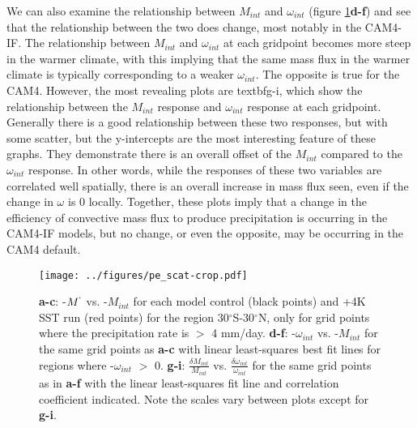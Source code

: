 \documentclass[letterpaper,12pt,titlepage,oneside,final]{book}
\begin{document}
We can also examine the relationship between $M_{int}$ and $\omega_{int}$ (figure \ref{fig:pe}\textbf{d-f}) and see that the relationship between the two does change, most notably in the CAM4-IF. The relationship between $M_{int}$ and $\omega_{int}$  at each gridpoint becomes more steep in the warmer climate, with this implying that the same mass flux in the warmer climate is typically corresponding to a weaker $\omega_{int}$. The opposite is true for the CAM4. However, the most revealing plots are textbf{g-i}, which show the relationship between the $M_{int}$ response and $\omega_{int}$ response at each gridpoint. Generally there is a good relationship between these two responses, but with some scatter, but the y-intercepts are the most interesting feature of these graphs. They demonstrate there is an overall offset of the $M_{int}$ compared to the $\omega_{int}$ response. In other words, while the responses of these two variables are correlated well spatially, there is an overall increase in mass flux seen, even if the change in $\omega$ is 0 locally. Together, these plots imply that a change in the efficiency of convective mass flux to produce precipitation is occurring in the CAM4-IF models, but no change, or even the opposite, may be occurring in the CAM4 default.

\begin{figure}[H]
\centering
\noindent\texttt{[image: ../figures/pe\_scat-crop.pdf]}\hfill
\caption{\textbf{a-c}: -$M^{`}$ vs. -$M_{int}$ for each model control (black points) and +4K SST run (red points) for the region 30$^\circ$S-30$^\circ$N, only for grid points where the precipitation rate is $>$ 4 mm/day. \textbf{d-f}: -$\omega_{int}$ vs. -$M_{int}$ for the same grid points as \textbf{a-c} with linear least-squares best fit lines for regions where -$\omega_{int}$ $>$ 0. \textbf{g-i}: $\frac{\delta{M_{int}}}{M_{int}}$ vs. $\frac{\delta{\omega_{int}}}{\omega_{int}}$ for the same grid points as in \textbf{a-f} with the linear least-squares fit line and correlation coefficient indicated. Note the scales vary between plots except for \textbf{g-i}.}
\label{fig:pe}
\end{figure}
\end{document}
